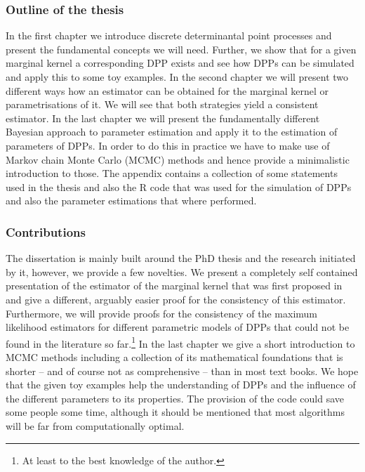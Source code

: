 \subsubsection{Outline of the thesis}
In the first chapter we introduce discrete determinantal point processes and present the fundamental concepts we will need. Further, we show that for a given marginal kernel a corresponding DPP exists and see how DPPs can be simulated and apply this to some toy examples. In the second chapter we will present two different ways how an estimator can be obtained for the marginal kernel or parametrisations of it. We will see that both strategies yield a consistent estimator. In the last chapter we will present the fundamentally different Bayesian approach to parameter estimation and apply it to the estimation of parameters of DPPs. In order to do this in practice we have to make use of Markov chain Monte Carlo (MCMC) methods and hence provide a minimalistic introduction to those.
The appendix contains a collection of some statements used in the thesis and also the R code that was used for the simulation of DPPs and also the parameter estimations that where performed.

\subsubsection{Contributions}
The dissertation is mainly built around the PhD thesis \cite{kulesza2012learning} and the research initiated by it, however, we provide a few novelties. We present a completely self contained presentation of the estimator of the marginal kernel that was first proposed in \cite{urschel2017learning} and give a different, arguably easier proof for the consistency of this estimator. Furthermore, we will provide proofs for the consistency of the maximum likelihood estimators for different parametric models of DPPs that could not be found in the literature so far.\footnote{At least to the best knowledge of the author.} In the last chapter we give a short introduction to MCMC methods including a collection of its mathematical foundations that is shorter -- and of course not as comprehensive -- than in most text books. We hope that the given toy examples help the understanding of DPPs and the influence of the different parameters to its properties. The provision of the code could save some people some time, although it should be mentioned that most algorithms will be far from computationally optimal.



